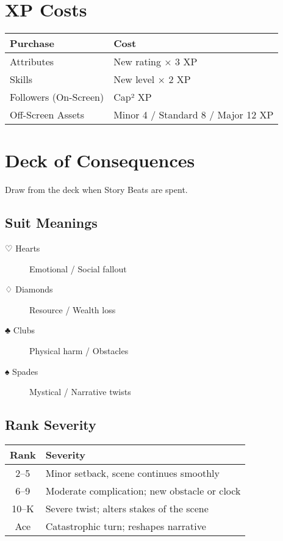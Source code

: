 \section{XP Costs}

\begin{center}
\begin{tabular}{ll}
\toprule
\textbf{Purchase} & \textbf{Cost} \\
\midrule
Attributes & New rating × 3 XP \\
Skills & New level × 2 XP \\
Followers (On-Screen) & Cap² XP \\
Off-Screen Assets & Minor 4 / Standard 8 / Major 12 XP \\
\bottomrule
\end{tabular}
\end{center}

\section{Deck of Consequences}

Draw from the deck when Story Beats are spent.

\subsection*{Suit Meanings}
\begin{description}
  \item[♡ Hearts] Emotional / Social fallout
  \item[♢ Diamonds] Resource / Wealth loss
  \item[♣ Clubs] Physical harm / Obstacles
  \item[♠ Spades] Mystical / Narrative twists
\end{description}

\subsection*{Rank Severity}
\begin{center}
\begin{tabular}{cl}
\toprule
\textbf{Rank} & \textbf{Severity} \\
\midrule
2–5 & Minor setback, scene continues smoothly \\
6–9 & Moderate complication; new obstacle or clock \\
10–K & Severe twist; alters stakes of the scene \\
Ace & Catastrophic turn; reshapes narrative \\
\bottomrule
\end{tabular}
\end{center}

